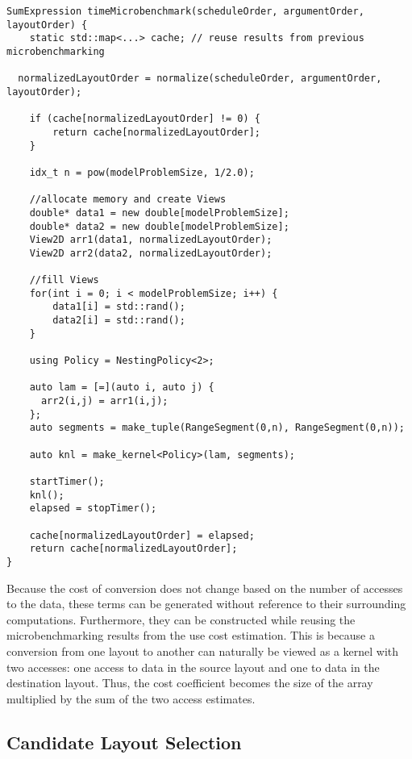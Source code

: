 \begin{lstlisting}[caption={Algorithm for microbenchmark timing. Implementation is shown for two-dimensional case. Actual implementation uses template metaprogramming to generalize the dimensionality.}]
SumExpression timeMicrobenchmark(scheduleOrder, argumentOrder, layoutOrder) {
	static std::map<...> cache; // reuse results from previous microbenchmarking

  normalizedLayoutOrder = normalize(scheduleOrder, argumentOrder, layoutOrder);

	if (cache[normalizedLayoutOrder] != 0) {
		return cache[normalizedLayoutOrder];
	}

	idx_t n = pow(modelProblemSize, 1/2.0);

	//allocate memory and create Views
	double* data1 = new double[modelProblemSize];
	double* data2 = new double[modelProblemSize];
	View2D arr1(data1, normalizedLayoutOrder);
	View2D arr2(data2, normalizedLayoutOrder);

	//fill Views
	for(int i = 0; i < modelProblemSize; i++) {
		data1[i] = std::rand();
		data2[i] = std::rand();
	}

	using Policy = NestingPolicy<2>;

	auto lam = [=](auto i, auto j) {
	  arr2(i,j) = arr1(i,j);
	};
	auto segments = make_tuple(RangeSegment(0,n), RangeSegment(0,n));

	auto knl = make_kernel<Policy>(lam, segments);

	startTimer();
	knl();
	elapsed = stopTimer();

	cache[normalizedLayoutOrder] = elapsed;
	return cache[normalizedLayoutOrder];
}
\end{lstlisting}


Because the cost of conversion does not change based on the number of accesses to the data, these terms can be generated without reference to their surrounding computations.
Furthermore, they can be constructed while reusing the microbenchmarking results from the use cost estimation.
This is because a conversion from one layout to another can naturally be viewed as a kernel with two accesses: one access to data in the source layout and one to data in the destination layout.
Thus, the cost coefficient becomes the size of the array multiplied by the sum of the two access estimates.


\subsection{Candidate Layout Selection}

